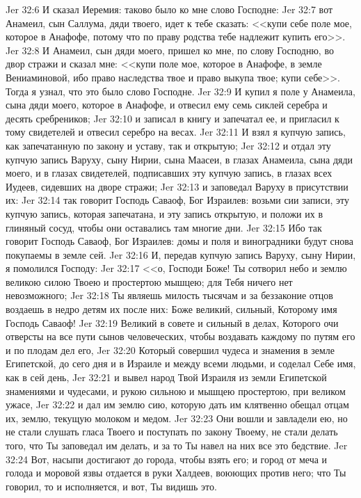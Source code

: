 \rsbpar\vs Jer 32:6 И сказал Иеремия: таково было ко мне слово Господне:
\vs Jer 32:7 вот Анамеил, сын Саллума, дяди твоего, идет к тебе сказать: <<купи себе поле мое, которое в Анафофе, потому что по праву родства тебе надлежит купить его>>.
\vs Jer 32:8 И Анамеил, сын дяди моего, пришел ко мне, по слову Господню, во двор стражи и сказал мне: <<купи поле мое, которое в Анафофе, в земле Вениаминовой, ибо право наследства твое и право выкупа твое; купи себе>>. Тогда я узнал, что это было слово Господне.
\vs Jer 32:9 И купил я поле у Анамеила, сына дяди моего, которое в Анафофе, и отвесил ему семь сиклей серебра и десять сребреников;
\vs Jer 32:10 и записал в книгу и запечатал ее, и пригласил к тому свидетелей и отвесил серебро на весах.
\vs Jer 32:11 И взял я купчую запись, как запечатанную по закону и уставу, так и открытую;
\vs Jer 32:12 и отдал эту купчую запись Варуху, сыну Нирии, сына Маасеи, в глазах Анамеила, сына дяди моего, и в глазах свидетелей, подписавших эту купчую запись, в глазах всех Иудеев, сидевших на дворе стражи;
\vs Jer 32:13 и заповедал Варуху в присутствии их:
\vs Jer 32:14 так говорит Господь Саваоф, Бог Израилев: возьми сии записи, эту купчую запись, которая запечатана, и эту запись открытую, и положи их в глиняный сосуд, чтобы они оставались там многие дни.
\vs Jer 32:15 Ибо так говорит Господь Саваоф, Бог Израилев: домы и поля и виноградники будут снова покупаемы в земле сей.
\vs Jer 32:16 И, передав купчую запись Варуху, сыну Нирии, я помолился Господу:
\vs Jer 32:17 <<о, Господи Боже! Ты сотворил небо и землю великою силою Твоею и простертою мышцею; для Тебя ничего нет невозможного;
\vs Jer 32:18 Ты являешь милость тысячам и за беззаконие отцов воздаешь в недро детям их после них: Боже великий, сильный, Которому имя Господь Саваоф!
\vs Jer 32:19 Великий в совете и сильный в делах, Которого очи отверсты на все пути сынов человеческих, чтобы воздавать каждому по путям его и по плодам дел его,
\vs Jer 32:20 Который совершил чудеса и знамения в земле Египетской,  до сего дня и в Израиле и между всеми людьми, и соделал Себе имя, как в сей день,
\vs Jer 32:21 и вывел народ Твой Израиля из земли Египетской знамениями и чудесами, и рукою сильною и мышцею простертою, при великом ужасе,
\vs Jer 32:22 и дал им землю сию, которую дать им клятвенно обещал отцам их, землю, текущую молоком и медом.
\vs Jer 32:23 Они вошли и завладели ею, но не стали слушать гласа Твоего и поступать по закону Твоему, не стали делать того, что Ты заповедал им делать, и за то Ты навел на них все это бедствие.
\vs Jer 32:24 Вот, насыпи достигают до города, чтобы взять его; и город от меча и голода и моровой язвы отдается в руки Халдеев, воюющих против него; что Ты говорил, то и исполняется, и вот, Ты видишь это.
